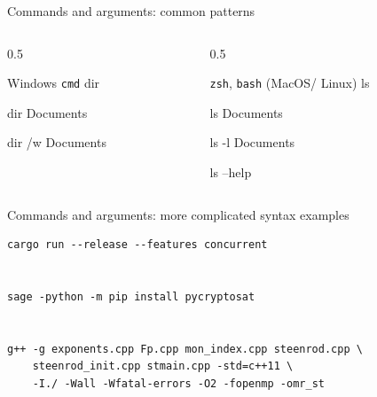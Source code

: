 \documentclass[xcolor={svgnames,x11names,dvipsnames}]{beamer}
\newcommand{\cmd}{}
\begin{document}
\begin{frame} [fragile] {Commands and arguments: common patterns}
\begin{columns}[t]
\begin{column}{0.5\textwidth}
\begin{block}{Windows \tt{cmd}}
\cmd{dir}
\vspace{15pt}

\cmd{dir Documents}
\vspace{15pt}

\cmd{dir /w Documents}
\end{block}
\end{column}
\begin{column}{0.5\textwidth}
\begin{block}{{\tt zsh}, {\tt bash} (MacOS/ Linux)}
\cmd{ls}
\vspace{15pt}

\cmd{ls Documents}
\vspace{15pt}

\cmd{ls -l Documents}
\vspace{15pt}

\cmd{ls --help}
\end{block}
\end{column}
\end{columns}
\end{frame}

\begin{frame}[fragile] {Commands and arguments: more complicated syntax examples}
\color{darkgreen}
\begin{verbatim}
cargo run --release --features concurrent


sage -python -m pip install pycryptosat


g++ -g exponents.cpp Fp.cpp mon_index.cpp steenrod.cpp \
    steenrod_init.cpp stmain.cpp -std=c++11 \
    -I./ -Wall -Wfatal-errors -O2 -fopenmp -omr_st

\end{verbatim}
\end{frame}
\end{document}
